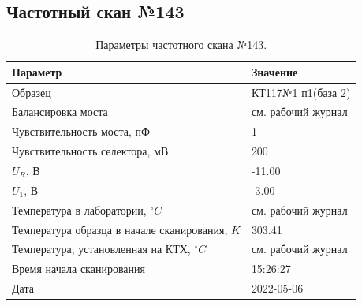 \subsection{Частотный скан №143}
\begin{table}[!ht]
    \centering
    \caption{Параметры частотного скана №143.}
    \begin{tabular}{|l|l|}
        \hline
        Параметр                                       & Значение                  \\ \hline
        Образец                                        & КТ117№1 п1(база 2)        \\ \hline
        Балансировка моста                             & см. рабочий журнал        \\ \hline
        Чувствительность моста, пФ                     & 1                         \\ \hline
        Чувствительность селектора, мВ                 & 200                       \\ \hline
        $U_R$, В                                       & -11.00                    \\ \hline
        $U_1$, В                                       & -3.00                     \\ \hline
        Температура в лаборатории, $^\circ C$          & см. рабочий журнал        \\ \hline
        Температура образца в начале сканирования, $K$ & 303.41                    \\ \hline
        Температура, установленная на КТХ, $^\circ C$  & см. рабочий журнал        \\ \hline
        Время начала сканирования                      & 15:26:27                  \\ \hline
        Дата                                           & 2022-05-06                \\ \hline
    \end{tabular}
    \label{table:frequency_scan_143}
\end{table}

